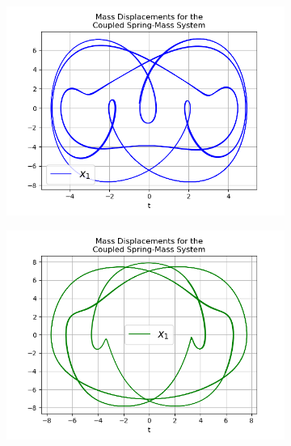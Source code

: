 \documentclass{article}
\begin{document}
\begin{figure}[h!]
  \centering
  \begin{subfigure}[b]{0.45\linewidth}
    \includegraphics[width=\linewidth]{two_springs321.png}
    \caption{}
  \end{subfigure}
  \begin{subfigure}[b]{0.45\linewidth}
    \includegraphics[width=\linewidth]{two_springs322.png}
    \caption{}
  \end{subfigure}
  \begin{subfigure}[b]{0.5\linewidth}

\end{subfigure}
\end{figure}
\end{document}
